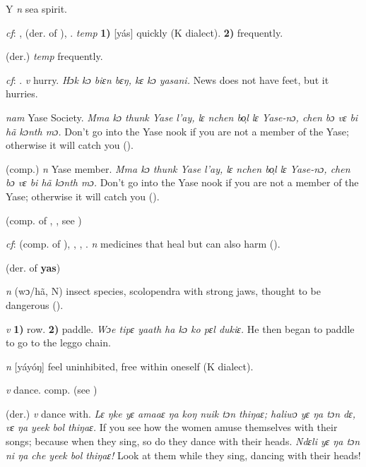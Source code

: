 \begin{letter}{Y}
 \textit{n} sea spirit.

 \textit{cf}: ,  (der. of ), . \textit{temp} \textbf{1)} [yás] quickly (K dialect). \textbf{2)} frequently.

 (der.) \textit{temp} frequently.

 \textit{cf}: . \textit{v} hurry. \textit{Hɔk kɔ biɛn bɛŋ, kɛ kɔ yasani.} News does not have feet, but it hurries.

 \textit{nam} Yase Society. \textit{Mma kɔ thunk Yase l'ay, lɛ nchen bo̹l lɛ Yase-nɔ, chen bɔ vɛ bi hã kɔnth mɔ.} Don't go into the Yase nook if you are not a member of the Yase; otherwise it will catch you (\citealt{Pichl1967}). 

 (comp.) \textit{n} Yase member. \textit{Mma kɔ thunk Yase l'ay, lɛ nchen bo̹l lɛ Yase-nɔ, chen bɔ vɛ bi hã kɔnth mɔ.} Don't go into the Yase nook if you are not a member of the Yase; otherwise it will catch you (\citealt{Pichl1967}). 

 (comp. of , , see ) 

 \textit{cf}:  (comp. of ), , , . \textit{n} medicines that heal but can also harm (\citealt{Hall1938}). 

 (der. of \textbf{yas})

 \textit{n} (wɔ/hã, N) insect species, scolopendra with strong jaws, thought to be dangerous (\citealt{Pichl1967}).

 \textit{v} \textbf{1)} row. \textbf{2)} paddle. \textit{Wɔe tipɛ yaath ha kɔ ko pɛl dukiɛ.} He then began to paddle to go to the leggo chain.

 \textit{n} [yáyóŋ] feel uninhibited, free within oneself (K dialect). 

 \textit{v} dance. comp.  (see ) 

 (der.) \textit{v} dance with. \textit{Lɛ ŋke yɛ amaaɛ ŋa koŋ nuik tɔn thiŋaɛ; haliwɔ yɛ ŋa tɔn dɛ, vɛ ŋa yeek bol thiŋaɛ.} If you see how the women amuse themselves with their songs; because when they sing, so do they dance with their heads. \textit{Ndɛli yɛ ŋa tɔn ni ŋa che yeek bol thiŋaɛ!} Look at them while they sing, dancing with their heads!


\end{letter}
